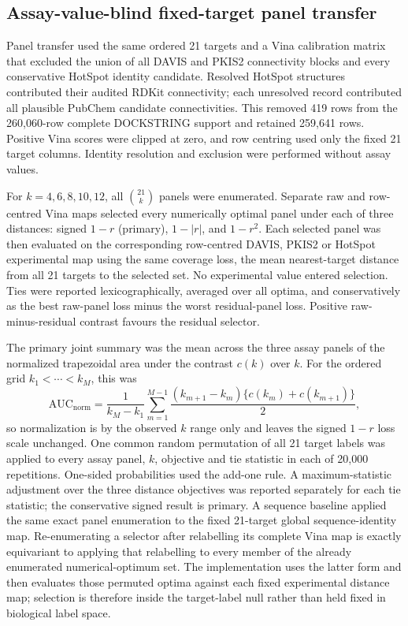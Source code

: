 \subsection{Assay-value-blind fixed-target panel transfer}

Panel transfer used the same ordered 21 targets and a Vina calibration matrix
that excluded the union of all DAVIS and PKIS2 connectivity blocks and every
conservative HotSpot identity candidate. Resolved HotSpot structures contributed
their audited RDKit connectivity; each unresolved record contributed all
plausible PubChem candidate connectivities. This removed 419 rows from the
260,060-row complete DOCKSTRING support and retained 259,641 rows. Positive
Vina scores were clipped at zero, and row centring used only the fixed 21 target
columns. Identity resolution and exclusion were performed without assay values.

For $k=4,6,8,10,12$, all $\binom{21}{k}$ panels were enumerated. Separate raw
and row-centred Vina maps selected every numerically optimal panel under each of
three distances: signed $1-r$ (primary), $1-|r|$, and $1-r^2$. Each selected
panel was then evaluated on the corresponding row-centred DAVIS, PKIS2 or
HotSpot experimental map using the same coverage loss, the mean nearest-target
distance from all 21 targets to the selected set. No experimental value entered
selection. Ties were reported lexicographically, averaged over all optima, and
conservatively as the best raw-panel loss minus the worst residual-panel loss.
Positive raw-minus-residual contrast favours the residual selector.

The primary joint summary was the mean across the three assay panels of the
normalized trapezoidal area under the contrast $c(k)$ over $k$. For the ordered
grid $k_1<\cdots<k_M$, this was
\begin{equation*}
\mathrm{AUC}_{\mathrm{norm}}
=\frac{1}{k_M-k_1}\sum_{m=1}^{M-1}
\frac{(k_{m+1}-k_m)\{c(k_m)+c(k_{m+1})\}}{2},
\end{equation*}
so normalization is by the observed $k$ range only and leaves the signed
$1-r$ loss scale unchanged. One common random
permutation of all 21 target labels was applied to every assay panel, $k$,
objective and tie statistic in each of 20,000 repetitions. One-sided
probabilities used the add-one rule. A maximum-statistic adjustment over the
three distance objectives was reported separately for each tie statistic; the
conservative signed result is primary. A sequence baseline applied the same
exact panel enumeration to the fixed 21-target global sequence-identity map.
Re-enumerating a selector after relabelling its complete Vina map is exactly
equivariant to applying that relabelling to every member of the already
enumerated numerical-optimum set. The implementation uses the latter form and
then evaluates those permuted optima against each fixed experimental distance
map; selection is therefore inside the target-label null rather than held fixed
in biological label space.

